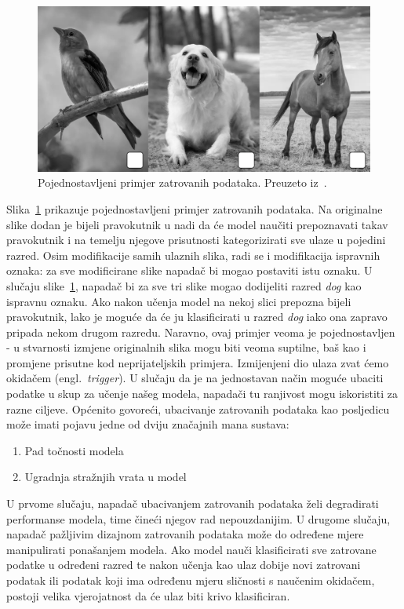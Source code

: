 \documentclass[times, utf8, zavrsni, numeric]{fer}
\begin{document}
\begin{figure}[htb]
    \centering
    \includegraphics[scale=0.4]{poisoned_img.png}
    \caption{Pojednostavljeni primjer zatrovanih podataka. Preuzeto iz~\cite{menon2023poisoned}.}
    \label{fig:poisoned_imgs}
\end{figure}

Slika~\ref{fig:poisoned_imgs} prikazuje pojednostavljeni primjer zatrovanih podataka. 
Na originalne slike dodan je bijeli pravokutnik u nadi da će model naučiti prepoznavati takav pravokutnik i na temelju njegove prisutnosti kategorizirati sve ulaze u pojedini razred.
Osim modifikacije samih ulaznih slika, radi se i modifikacija ispravnih oznaka: za sve modificirane slike napadač bi mogao postaviti istu oznaku.
U slučaju slike~\ref{fig:poisoned_imgs}, napadač bi za sve tri slike mogao dodijeliti razred \textit{dog} kao ispravnu oznaku. 
Ako nakon učenja model na nekoj slici prepozna bijeli pravokutnik, lako je moguće da će ju klasificirati u razred \textit{dog} iako ona zapravo pripada nekom drugom razredu.
Naravno, ovaj primjer veoma je pojednostavljen - u stvarnosti izmjene originalnih slika mogu biti veoma suptilne, baš kao i promjene prisutne kod neprijateljskih primjera.
Izmijenjeni dio ulaza zvat ćemo okidačem (engl.\ \textit{trigger}).
U slučaju da je na jednostavan način moguće ubaciti podatke u skup za učenje našeg modela, napadači tu ranjivost mogu iskoristiti za razne ciljeve.
Općenito govoreći, ubacivanje zatrovanih podataka kao posljedicu može imati pojavu jedne od dviju značajnih mana sustava:

\begin{enumerate}
    \item Pad točnosti modela
    \item Ugradnja stražnjih vrata u model
\end{enumerate}

U prvome slučaju, napadač ubacivanjem zatrovanih podataka želi degradirati performanse modela, time čineći njegov rad nepouzdanijim.
U drugome slučaju, napadač pažljivim dizajnom zatrovanih podataka može do određene mjere manipulirati ponašanjem modela. 
Ako model nauči klasificirati sve zatrovane podatke u određeni razred te nakon učenja kao ulaz dobije novi zatrovani podatak ili podatak koji ima određenu mjeru sličnosti s naučenim okidačem,
postoji velika vjerojatnost da će ulaz biti krivo klasificiran.  
\end{document}
